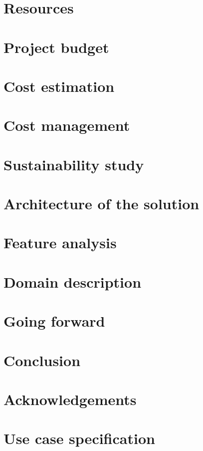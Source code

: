 \documentclass{report}
\begin{document}
    \chapter{Resources}
    
    
    \chapter{Project budget}
    
    
    \chapter{Cost estimation}
    
    
    \chapter{Cost management}
    
    
    \chapter{Sustainability study}
    
    
    \chapter{Architecture of the solution}
    
    
    \chapter{Feature analysis}
    
    
    \chapter{Domain description}
    

    \chapter{Going forward}
    

    \chapter{Conclusion}
    

    \chapter{Acknowledgements}
    

    

    \appendix
        \chapter{Use case specification}
        
\end{document}

